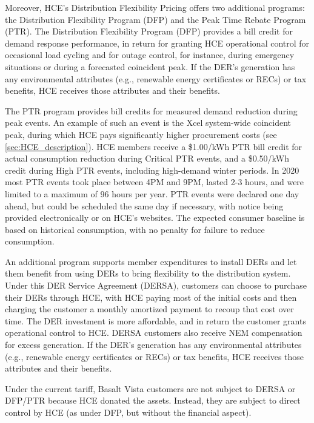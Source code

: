Moreover, HCE's Distribution Flexibility Pricing offers two additional programs: the Distribution Flexibility Program (DFP) and the Peak Time Rebate Program (PTR). The Distribution Flexibility Program (DFP) provides a bill credit for demand response performance, in return for granting HCE operational control for occasional load cycling and for outage control, for instance, during emergency situations or during a forecasted coincident peak. If the DER's generation has any environmental attributes (e.g., renewable energy certificates or RECs) or tax benefits, HCE receives those attributes and their benefits.

The PTR program provides bill credits for measured demand reduction during peak events. An example of such an event is the Xcel system-wide coincident peak, during which HCE pays significantly higher procurement costs (see \cref{sec:HCE_description}). HCE members receive a \$1.00/kWh PTR bill credit for actual consumption reduction during Critical PTR events, and a \$0.50/kWh credit during High PTR events, including high-demand winter periods. In 2020 most PTR events took place between 4PM and 9PM, lasted 2-3 hours, and were limited to a maximum of 96 hours per year. PTR events were declared one day ahead, but could be scheduled the same day if necessary, with notice being provided electronically or on HCE's websites. The expected consumer baseline is based on historical consumption, with no penalty for failure to reduce consumption.

An additional program supports member expenditures to install DERs and let them benefit from using DERs to bring flexibility to the distribution system. Under this DER Service Agreement (DERSA), customers can choose to purchase their DERs through HCE, with HCE paying most of the initial costs and then charging the customer a monthly amortized payment to recoup that cost over time. The DER investment is more affordable, and in return the customer grants operational control to HCE. DERSA customers also receive NEM compensation for excess generation. If the DER's generation has any environmental attributes (e.g., renewable energy certificates or RECs) or tax benefits, HCE receives those attributes and their benefits. 

Under the current tariff, Basalt Vista customers are not subject to DERSA or DFP/PTR because HCE donated the assets. Instead, they are subject to direct control by HCE (as under DFP, but without the financial aspect). 





